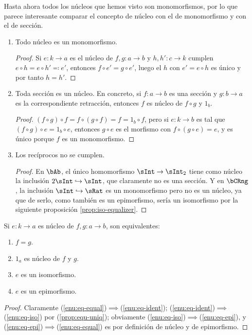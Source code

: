 Hasta ahora todos los núcleos que hemos visto son monomorfismos, por lo que
parece interesante comparar el concepto de núcleo con el de monomorfismo y con
el de sección.

\begin{proposition}\;
  \label{prop:equ-middle}
  \begin{enumerate}
  \item Todo núcleo es un monomorfismo.
    \begin{proof}
      Si $e:k\to a$ es el núcleo de $f,g:a\to b$ y $h,h':c\to k$ cumplen
      $e\circ h=e\circ h'\eqqcolon e'$, entonces $f\circ e'=g\circ e'$, luego el
      $h$ con $e'=e\circ h$ es único y por tanto $h=h'$.
    \end{proof}
  \item Toda sección es un núcleo. En concreto, si $f:a\to b$ es una sección y
    $g:b\to a$ es la correspondiente retracción, entonces $f$ es núcleo de
    $f\circ g$ y $1_b$.
    \begin{proof}
      $(f\circ g)\circ f=f\circ(g\circ f)=f=1_b\circ f$, pero si $e:k\to b$ es
      tal que $(f\circ g)\circ e=1_b\circ e$, entonces $g\circ e$ es el morfismo
      con $f\circ(g\circ e)=e$, y es único porque $f$ es un monomorfismo.
    \end{proof}
  \item \label{enu:equ-mid-strict} Los recíprocos no se cumplen.
    \begin{proof}
      En $\bAb$, el único homomorfismo $\sInt\to\sInt_2$ tiene como núcleo la
      inclusión $2\sInt\inTo\sInt$, que claramente no es una sección. Y en
      $\bCRng$, la inclusión $\sInt\inTo\sRat$ es un monomorfismo pero no es un
      núcleo, ya que de serlo, como también es un epimorfismo, sería un
      isomorfismo por la siguiente proposición \ref{prop:iso-equalizer}.
    \end{proof}
  \end{enumerate}
\end{proposition}

\begin{proposition}
  \label{prop:iso-equalizer} Si $e:k\to a$ es núcleo de $f,g:a\to b$, son
  equivalentes:
  \begin{enumerate}
  \item \label{enu:eq-equal} $f=g$.
  \item \label{enu:eq-ident} $1_a$ es núcleo de $f$ y $g$.
  \item \label{enu:eq-iso} $e$ es un isomorfismo.
  \item \label{enu:eq-epi} $e$ es un epimorfismo.
  \end{enumerate}
\end{proposition}
\begin{proof}
  Claramente (\ref{enu:eq-equal})$\implies$(\ref{enu:eq-ident});
  (\ref{enu:eq-ident})$\implies$(\ref{enu:eq-iso}) por (\ref{prop:equ-uniq});
  obviamente (\ref{enu:eq-iso})$\implies$(\ref{enu:eq-epi}), y
  (\ref{enu:eq-epi})$\implies$(\ref{enu:eq-equal}) es por definición de núcleo y
  de epimorfismo.
\end{proof}

